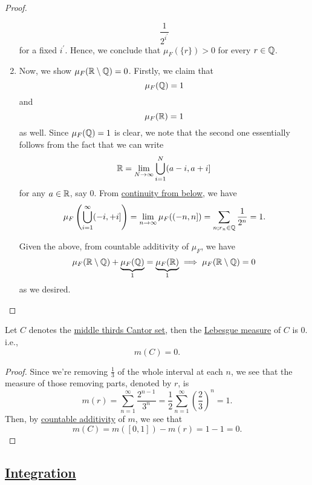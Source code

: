 \begin{proof}
\begin{enumerate}
		      \[
			      \frac{1}{2^{i ^\prime }}
		      \]
		      for a fixed \(i ^\prime \). Hence, we conclude that \(\mu _{F}(\{r\}) > 0\) for every \(r\in\mathbb{\MakeUppercase{q}} \).
		\item Now, we show \(\mu _{F}(\mathbb{\MakeUppercase{r}} \setminus \mathbb{\MakeUppercase{q}} ) = 0\). Firstly, we claim that
		      \[
			      \mu _{F}(\mathbb{\MakeUppercase{q}} ) = 1
		      \]
		      and
		      \[
			      \mu _{F}(\mathbb{\MakeUppercase{r}} ) = 1
		      \]
		      as well. Since \(\mu _{F}(\mathbb{\MakeUppercase{q}} ) = 1\) is clear, we note that the second one essentially follows from the fact that we can write
		      \[
			      \mathbb{\MakeUppercase{r}} = \lim\limits_{N \to \infty} \bigcup\limits_{i=1}^{N} (a-i, a+i]
		      \]
		      for any \(a\in\mathbb{\MakeUppercase{r}} \), say \(0\). From \hyperref[thm:measure-space-continuity-from-below]{continuity from below}, we have
		      \[
			      \mu _{F}\left(\bigcup\limits_{i=1}^{\infty} (-i, +i]\right) = \lim\limits_{n \to \infty} \mu _{F}((-n, n]) = \sum\limits_{n;r_{n}\in\mathbb{\MakeUppercase{q}} }\frac{1}{2^n} = 1.
		      \]

		      \par Given the above, from countable additivity of \(\mu _{F}\), we have
		      \[
			      \mu _{F}(\mathbb{\MakeUppercase{r}} \setminus \mathbb{\MakeUppercase{q}} ) + \underbrace{\mu _{F}(\mathbb{\MakeUppercase{q}} )}_{1} = \underbrace{\mu _{F}(\mathbb{\MakeUppercase{r}} )}_{1} \implies \mu _{F}(\mathbb{\MakeUppercase{r}} \setminus \mathbb{\MakeUppercase{q}} ) = 0
		      \]
		      as we desired.
	\end{enumerate}
\end{proof}

\begin{lemma}\label{lma:Cantor-set-has-measure-0}
	Let \(C\) denotes the \hyperref[eg:lec8:Cantor-set]{middle thirds Cantor set}, then the \hyperref[def:Lebesgue-measure]{Lebesgue measure} of \(C\) is \(0\). i.e.,
	\[
		m(C) = 0.
	\]
\end{lemma}
\begin{proof}
	Since we're removing \(\frac{1}{3}\) of the whole interval at each \(n\), we see that the measure of those removing parts, denoted by \(r\), is
	\[
		m(r) = \sum\limits_{n=1}^{\infty} \frac{2^{n-1}}{3^n} = \frac{1}{2}\sum\limits_{n=1}^{\infty} \left(\frac{2}{3}\right)^n = 1.
	\]
	Then, by \hyperref[def:measure]{countable additivity} of \(m\), we see that
	\[
		m(C) = m([0, 1]) - m(r) = 1 - 1 = 0.
	\]
\end{proof}

\subsection{\hyperref[sec:Integration]{Integration}}
